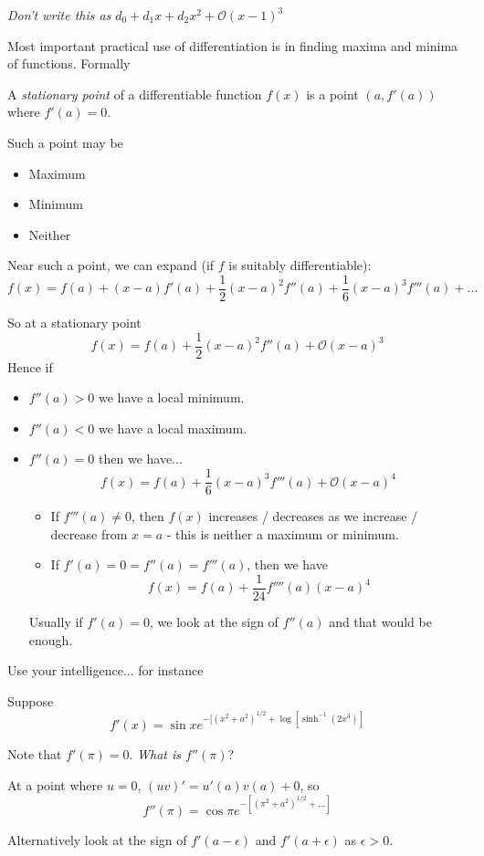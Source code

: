 \documentclass[twoside]{scrartcl}
\begin{document}
\emph{Don't write this as} $d_0 + d_1x + d_2x^2 + \mathcal{O}(x-1)^3$



Most important  practical use of differentiation is in finding maxima and minima of functions. Formally\vspace*{5pt}

\begin{definition}
A \emph{stationary point} of a differentiable function $f(x)$ is a point $(a, f'(a))$ where $f'(a) = 0$. 
\end{definition}

Such a point may be 
\begin{itemize}
  \item Maximum
  \item Minimum
  \item Neither
\end{itemize}

Near such a point, we can expand (if $f$ is suitably differentiable): 
\[f(x) = f(a) + (x-a)f'(a) + \frac{1}{2}(x-a)^2f''(a) + \frac{1}{6}(x-a)^3f'''(a) + \dots \]

So at a stationary point
\[f(x) = f(a) + \frac{1}{2}(x-a)^2f''(a) + \mathcal{O}(x-a)^3\]
Hence if 
\begin{itemize}
  \item $f''(a) > 0$ we have a local minimum.
  \item $f''(a) < 0$ we have a  local maximum.
  \item $f''(a) = 0$ then we have...
  \[f(x) = f(a) + \frac{1}{6}(x-a)^3f'''(a) + \mathcal{O}(x-a)^4\]

\begin{itemize}
  \item If $f'''(a) \neq 0$, then $f(x)$ increases / decreases as we increase / decrease from $x=a$ - this is neither a maximum or minimum. 


\item If $f'(a) = 0 = f''(a) = f'''(a)$, then we have 
\[f(x) = f(a) + \frac{1}{24}f''''(a)(x-a)^4\]
\end{itemize}

Usually if $f'(a) = 0$, we look at the sign of $f''(a)$ and that would be enough. 
\end{itemize}\vspace*{5pt}

Use your intelligence... for instance\\

\begin{example}
Suppose
\[f'(x) = \sin x e^{-[(x^2 + a^2)^{1/2} + \log[\sinh^{-1}(2x^3)]}\]	

Note that $f'(\pi) = 0$. \emph{What is $f''(\pi)$}? 

At a point where $u = 0$, $(uv)' = u'(a)v(a) + 0$, so 
\[f''(\pi) = \cos\pi e^{-[(\pi^2+a^2)^{1/2} + \dots ]} \]

Alternatively look at the sign of $f'(a-\epsilon)$ and $f'(a+\epsilon)$ as $\epsilon >0$. 
\end{example}
\end{document}
